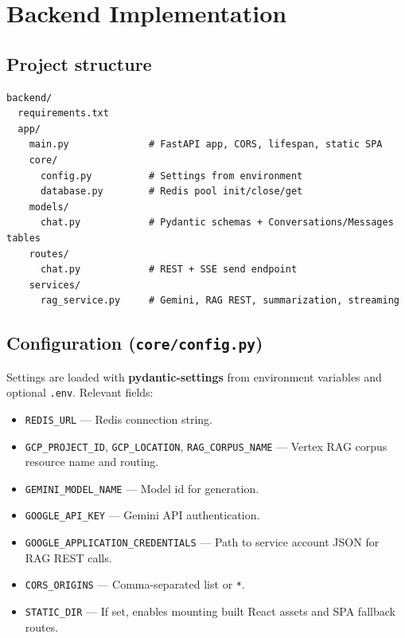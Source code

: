 \documentclass[11pt,a4paper]{article}
\begin{document}
\section{Backend Implementation}

\subsection{Project structure}

\begin{lstlisting}
backend/
  requirements.txt
  app/
    main.py              # FastAPI app, CORS, lifespan, static SPA
    core/
      config.py          # Settings from environment
      database.py        # Redis pool init/close/get
    models/
      chat.py            # Pydantic schemas + Conversations/Messages tables
    routes/
      chat.py            # REST + SSE send endpoint
    services/
      rag_service.py     # Gemini, RAG REST, summarization, streaming
\end{lstlisting}

\subsection{Configuration (\texttt{core/config.py})}

Settings are loaded with \textbf{pydantic-settings} from environment variables and optional \texttt{.env}. Relevant fields:

\begin{itemize}[noitemsep]
  \item \texttt{REDIS\_URL} --- Redis connection string.
  \item \texttt{GCP\_PROJECT\_ID}, \texttt{GCP\_LOCATION}, \texttt{RAG\_CORPUS\_NAME} --- Vertex RAG corpus resource name and routing.
  \item \texttt{GEMINI\_MODEL\_NAME} --- Model id for generation.
  \item \texttt{GOOGLE\_API\_KEY} --- Gemini API authentication.
  \item \texttt{GOOGLE\_APPLICATION\_CREDENTIALS} --- Path to service account JSON for RAG REST calls.
  \item \texttt{CORS\_ORIGINS} --- Comma-separated list or \texttt{*}.
  \item \texttt{STATIC\_DIR} --- If set, enables mounting built React assets and SPA fallback routes.
\end{itemize}
\end{document}
